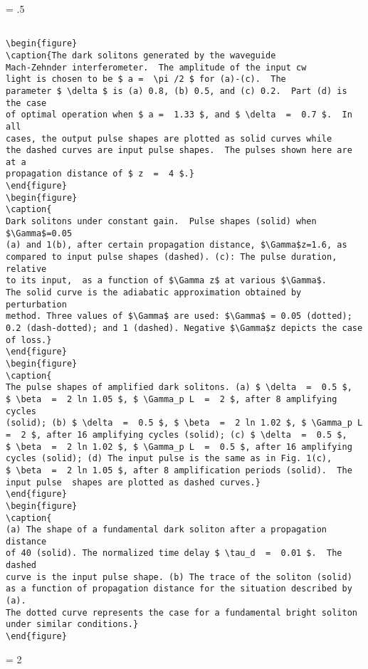 \newpage
\baselineskip = .5\baselineskip  %
\begin{verbatim}

\begin{figure}
\caption{The dark solitons generated by the waveguide
Mach-Zehnder interferometer.  The amplitude of the input cw
light is chosen to be $ a =  \pi /2 $ for (a)-(c).  The
parameter $ \delta $ is (a) 0.8, (b) 0.5, and (c) 0.2.  Part (d) is the case
of optimal operation when $ a =  1.33 $, and $ \delta  =  0.7 $.  In all
cases, the output pulse shapes are plotted as solid curves while
the dashed curves are input pulse shapes.  The pulses shown here are at a
propagation distance of $ z  =  4 $.}
\end{figure}
\begin{figure}
\caption{
Dark solitons under constant gain.  Pulse shapes (solid) when $\Gamma$=0.05
(a) and 1(b), after certain propagation distance, $\Gamma$z=1.6, as
compared to input pulse shapes (dashed). (c): The pulse duration, relative
to its input,  as a function of $\Gamma z$ at various $\Gamma$.
The solid curve is the adiabatic approximation obtained by perturbation
method. Three values of $\Gamma$ are used: $\Gamma$ = 0.05 (dotted);
0.2 (dash-dotted); and 1 (dashed). Negative $\Gamma$z depicts the case
of loss.}
\end{figure}
\begin{figure}
\caption{
The pulse shapes of amplified dark solitons. (a) $ \delta  =  0.5 $,
$ \beta  =  2 ln 1.05 $, $ \Gamma_p L  =  2 $, after 8 amplifying cycles
(solid); (b) $ \delta  =  0.5 $, $ \beta  =  2 ln 1.02 $, $ \Gamma_p L
=  2 $, after 16 amplifying cycles (solid); (c) $ \delta  =  0.5 $,
$ \beta  =  2 ln 1.02 $, $ \Gamma_p L  =  0.5 $, after 16 amplifying
cycles (solid); (d) The input pulse is the same as in Fig. 1(c),
$ \beta  =  2 ln 1.05 $, after 8 amplification periods (solid).  The
input pulse  shapes are plotted as dashed curves.}
\end{figure}
\begin{figure}
\caption{
(a) The shape of a fundamental dark soliton after a propagation distance
of 40 (solid). The normalized time delay $ \tau_d  =  0.01 $.  The dashed
curve is the input pulse shape. (b) The trace of the soliton (solid)
as a function of propagation distance for the situation described by (a).
The dotted curve represents the case for a fundamental bright soliton
under similar conditions.}
\end{figure}

\end{verbatim}
\newpage
\baselineskip = 2\baselineskip  %



